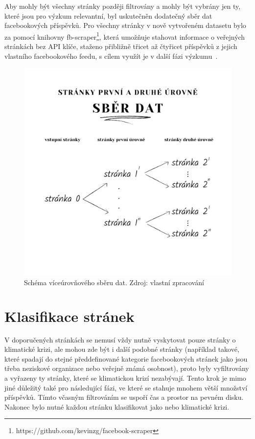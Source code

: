     Aby mohly být všechny stránky později filtrovány a mohly být vybrány jen ty, které jsou pro výzkum relevantní, byl uskutečněn dodatečný sběr dat facebookových příspěvků. Pro všechny stránky v nově vytvořeném datasetu bylo za pomocí knihovny fb-scraper\footnote{https://github.com/kevinzg/facebook-scraper}, která umožňuje stahovat informace o veřejných stránkách bez API klíče, staženo přibližně třicet až čtyřicet příspěvků z jejich vlastního facebookového feedu, s cílem využít je v další fázi výzkumu~\citep{pypi_2021}. 
    
    \begin{figure}[H]
        \includegraphics[width=\linewidth]{obrazky/sber_dat.jpg}
        \centering
        \caption[Schéma víceúrovňového sběru dat]{Schéma víceúrovňového sběru dat. Zdroj: vlastní zpracování}
        \label{fig:fb-sber-dat}
    \end{figure}
  
\section{Klasifikace stránek}
\label{sec:cisteni-klasifikace-dat}
    V doporučených stránkách se nemusí vždy nutně vyskytovat pouze stránky o klimatické krizi, ale mohou zde být i další podobné stránky (například takové, které spadají do stejné předdefinované kategorie facebookových stránek jako jsou třeba neziskové organizace nebo veřejně známá osobnost), proto byly vyfiltrovány a vyřazeny ty stránky, které se klimatickou krizí nezabývají. Tento krok je mimo jiné důležitý také pro následující fázi, ve které se stahuje mnohem větší množství příspěvků. Tímto včasným filtrováním se uspoří čas a prostor na pevném disku. Nakonec bylo nutné každou stránku klasifikovat jako  nebo  klimatické krizi. 
    
